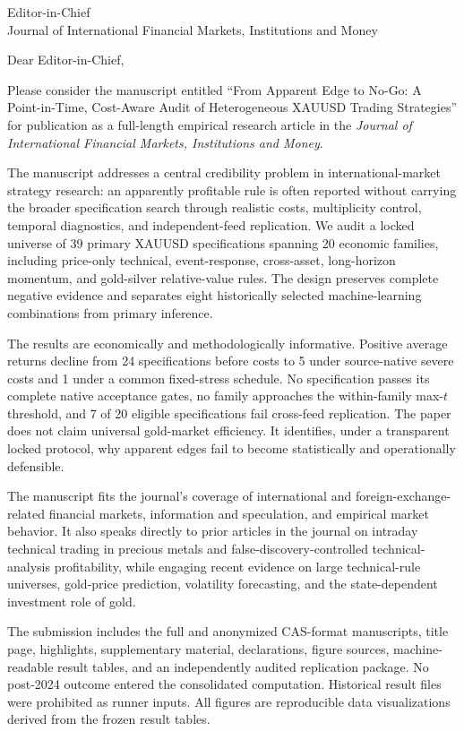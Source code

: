 \documentclass[10pt,a4paper]{letter}
\begin{document}
\begin{letter}{Editor-in-Chief\\Journal of International Financial Markets, Institutions and Money}
\opening{Dear Editor-in-Chief,}

Please consider the manuscript entitled ``From Apparent Edge to No-Go: A Point-in-Time, Cost-Aware Audit of Heterogeneous XAUUSD Trading Strategies'' for publication as a full-length empirical research article in the \emph{Journal of International Financial Markets, Institutions and Money}.

The manuscript addresses a central credibility problem in international-market strategy research: an apparently profitable rule is often reported without carrying the broader specification search through realistic costs, multiplicity control, temporal diagnostics, and independent-feed replication. We audit a locked universe of 39 primary XAUUSD specifications spanning 20 economic families, including price-only technical, event-response, cross-asset, long-horizon momentum, and gold-silver relative-value rules. The design preserves complete negative evidence and separates eight historically selected machine-learning combinations from primary inference.

The results are economically and methodologically informative. Positive average returns decline from 24 specifications before costs to 5 under source-native severe costs and 1 under a common fixed-stress schedule. No specification passes its complete native acceptance gates, no family approaches the within-family max-$t$ threshold, and 7 of 20 eligible specifications fail cross-feed replication. The paper does not claim universal gold-market efficiency. It identifies, under a transparent locked protocol, why apparent edges fail to become statistically and operationally defensible.

The manuscript fits the journal's coverage of international and foreign-exchange-related financial markets, information and speculation, and empirical market behavior. It also speaks directly to prior articles in the journal on intraday technical trading in precious metals and false-discovery-controlled technical-analysis profitability, while engaging recent evidence on large technical-rule universes, gold-price prediction, volatility forecasting, and the state-dependent investment role of gold.

The submission includes the full and anonymized CAS-format manuscripts, title page, highlights, supplementary material, declarations, figure sources, machine-readable result tables, and an independently audited replication package. No post-2024 outcome entered the consolidated computation. Historical result files were prohibited as runner inputs. All figures are reproducible data visualizations derived from the frozen result tables.


\end{letter}
\end{document}
